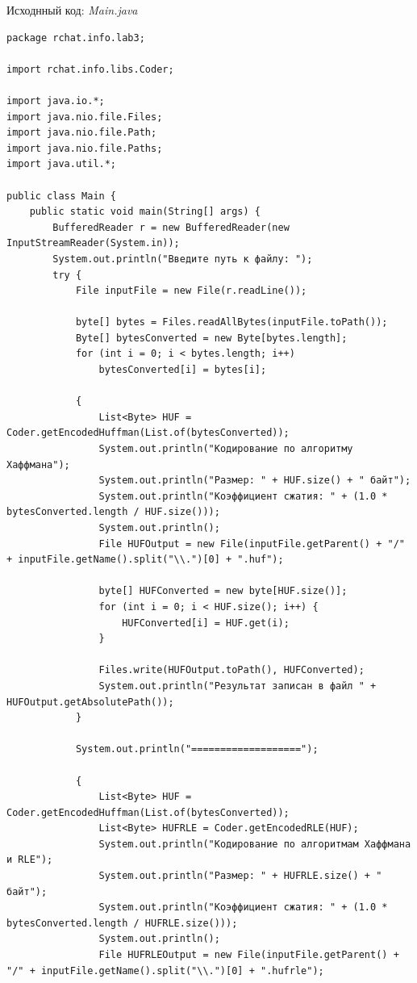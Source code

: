 \documentclass[a4paper,14pt]{extarticle}
\begin{document}
Исходнный код:
\textit{Main.java}
\begin{verbatim}
package rchat.info.lab3;

import rchat.info.libs.Coder;

import java.io.*;
import java.nio.file.Files;
import java.nio.file.Path;
import java.nio.file.Paths;
import java.util.*;

public class Main {
    public static void main(String[] args) {
        BufferedReader r = new BufferedReader(new InputStreamReader(System.in));
        System.out.println("Введите путь к файлу: ");
        try {
            File inputFile = new File(r.readLine());

            byte[] bytes = Files.readAllBytes(inputFile.toPath());
            Byte[] bytesConverted = new Byte[bytes.length];
            for (int i = 0; i < bytes.length; i++)
                bytesConverted[i] = bytes[i];

            {
                List<Byte> HUF = Coder.getEncodedHuffman(List.of(bytesConverted));
                System.out.println("Кодирование по алгоритму Хаффмана");
                System.out.println("Размер: " + HUF.size() + " байт");
                System.out.println("Коэффициент сжатия: " + (1.0 * bytesConverted.length / HUF.size()));
                System.out.println();
                File HUFOutput = new File(inputFile.getParent() + "/" + inputFile.getName().split("\\.")[0] + ".huf");

                byte[] HUFConverted = new byte[HUF.size()];
                for (int i = 0; i < HUF.size(); i++) {
                    HUFConverted[i] = HUF.get(i);
                }

                Files.write(HUFOutput.toPath(), HUFConverted);
                System.out.println("Результат записан в файл " + HUFOutput.getAbsolutePath());
            }

            System.out.println("===================");

            {
                List<Byte> HUF = Coder.getEncodedHuffman(List.of(bytesConverted));
                List<Byte> HUFRLE = Coder.getEncodedRLE(HUF);
                System.out.println("Кодирование по алгоритмам Хаффмана и RLE");
                System.out.println("Размер: " + HUFRLE.size() + " байт");
                System.out.println("Коэффициент сжатия: " + (1.0 * bytesConverted.length / HUFRLE.size()));
                System.out.println();
                File HUFRLEOutput = new File(inputFile.getParent() + "/" + inputFile.getName().split("\\.")[0] + ".hufrle");


\end{verbatim}
\end{document}
